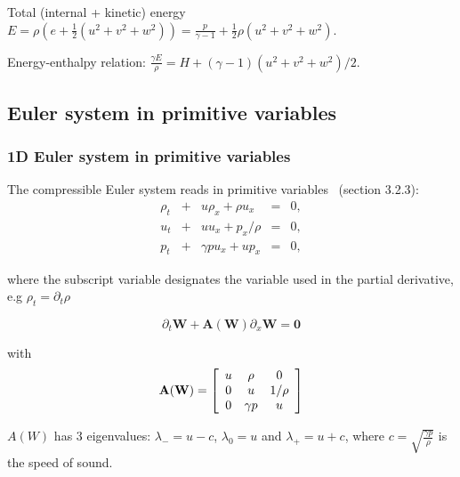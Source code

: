 \documentclass{article}
\begin{document}
Total (internal + kinetic) energy $E = \rho \left( e + \frac{1}{2} (u^2+v^2+w^2) \right) = \frac{p}{\gamma-1} + \frac{1}{2} \rho (u^2+v^2+w^2)$.

Energy-enthalpy relation: $\frac{\gamma E}{\rho}=H+(\gamma-1)(u^2+v^2+w^2)/2$.

\subsection{Euler system in primitive variables}

\subsubsection*{1D Euler system in primitive variables}
The compressible Euler system reads in primitive variables~\cite{toro} (section 3.2.3):\\

\begin{equation}
  \begin{array}{ccccc}
    \rho_t & + & u\rho_x + \rho u_x   & = & 0,\\
    u_t    & + & u u_x   + p_x/\rho   & = & 0,\\
    p_t    & + & \gamma p u_x + u p_x & = & 0,
  \end{array}
\end{equation}

where the subscript variable designates the variable used in the partial derivative, e.g $\rho_t = \partial_t \rho$

\begin{equation}
  \partial_t \mathbf{W} + \mathbf{A(W)} \partial_x \mathbf{W} = \mathbf{0}
\end{equation}

with
\begin{equation}
  \mathbf{A(W)} = \left[
    \begin{array}{c c c c}
      u & \rho     & 0 \\
      0 & u        & 1/\rho\\
      0 & \gamma p & u \\
    \end{array}
  \right]
\end{equation}

$A(W)$ has 3 eigenvalues: $\lambda_{-}=u-c$, $\lambda_{0}=u$ and $\lambda_{+}=u+c$, where $c=\sqrt{\frac{\gamma p}{\rho}}$ is the speed of sound. 
\end{document}
